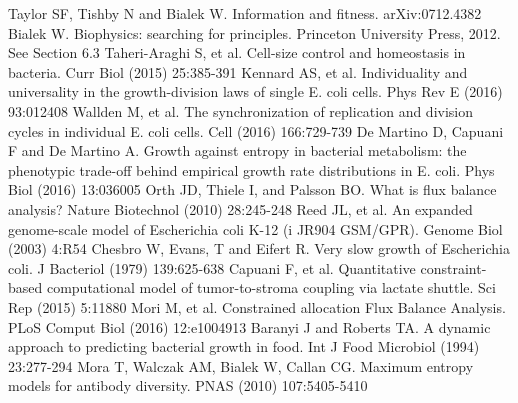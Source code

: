 \documentclass[superscriptaddress,amsmath,amssymb,twocolumn]{revtex4-1}
\begin{document}
\begin{thebibliography}{99}
Taylor SF, Tishby N and Bialek W. Information and fitness. arXiv:0712.4382
Bialek W. Biophysics: searching for principles. Princeton University Press, 2012. See Section 6.3
Taheri-Araghi S, et al. Cell-size control and homeostasis in bacteria. Curr Biol (2015) 25:385-391
Kennard AS, et al. Individuality and universality in the growth-division laws of single E. coli cells. Phys Rev E (2016) 93:012408
Wallden M, et al. The synchronization of replication and division cycles in individual E. coli cells. Cell (2016) 166:729-739
De Martino D, Capuani F and De Martino A. Growth against entropy in bacterial metabolism: the phenotypic trade-off behind empirical growth rate distributions in E. coli. Phys Biol (2016) 13:036005
Orth JD, Thiele I, and Palsson BO. What is flux balance analysis? Nature Biotechnol (2010) 28:245-248
Reed JL, et al. An expanded genome-scale model of Escherichia coli K-12 (i JR904 GSM/GPR). Genome Biol (2003) 4:R54
Chesbro W, Evans, T and Eifert R. Very slow growth of Escherichia coli. J Bacteriol (1979) 139:625-638
Capuani F, et al. Quantitative constraint-based computational model of tumor-to-stroma coupling via lactate shuttle. Sci Rep (2015) 5:11880
Mori M, et al. Constrained allocation Flux Balance Analysis. PLoS Comput Biol (2016) 12:e1004913
 Baranyi J and Roberts TA. A dynamic approach to predicting bacterial growth in food. Int J Food Microbiol (1994) 23:277-294
Mora T, Walczak AM, Bialek W, Callan CG. Maximum entropy models for antibody diversity. PNAS (2010) 107:5405-5410
\end{thebibliography}
\end{document}
